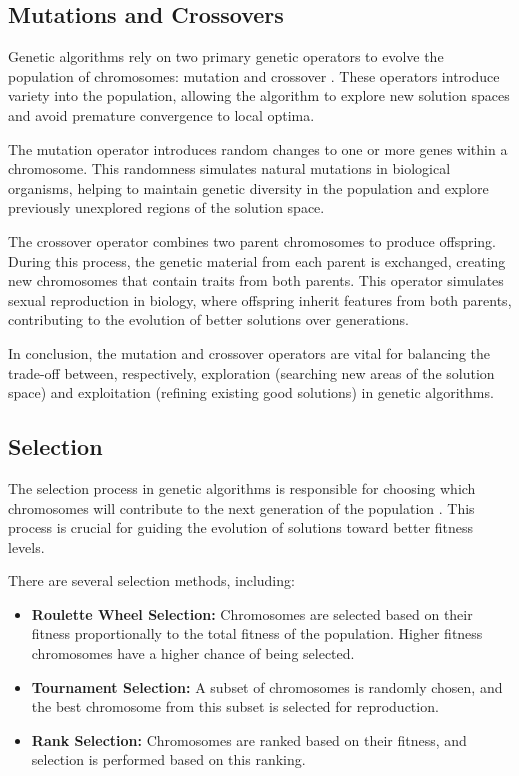     \subsection{Mutations and Crossovers}
    
        Genetic algorithms rely on two primary genetic operators to evolve the population of chromosomes: mutation and crossover \cite{holland1992adaptation}. These operators introduce variety into the population, allowing the algorithm to explore new solution spaces and avoid premature convergence to local optima.
        
        The mutation operator introduces random changes to one or more genes within a chromosome. This randomness simulates natural mutations in biological organisms, helping to maintain genetic diversity in the population and explore previously unexplored regions of the solution space.
        
        The crossover operator combines two parent chromosomes to produce offspring. During this process, the genetic material from each parent is exchanged, creating new chromosomes that contain traits from both parents. This operator simulates sexual reproduction in biology, where offspring inherit features from both parents, contributing to the evolution of better solutions over generations.

        In conclusion, the mutation and crossover operators are vital for balancing the trade-off between, respectively, exploration (searching new areas of the solution space) and exploitation (refining existing good solutions) in genetic algorithms.

    \subsection{Selection}
        The selection process in genetic algorithms is responsible for choosing which chromosomes will contribute to the next generation of the population \cite{holland1992adaptation}. This process is crucial for guiding the evolution of solutions toward better fitness levels.
        
        There are several selection methods, including:
        \begin{itemize}
            \item \textbf{Roulette Wheel Selection:} Chromosomes are selected based on their fitness proportionally to the total fitness of the population. Higher fitness chromosomes have a higher chance of being selected.
            \item \textbf{Tournament Selection:} A subset of chromosomes is randomly chosen, and the best chromosome from this subset is selected for reproduction.
            \item \textbf{Rank Selection:} Chromosomes are ranked based on their fitness, and selection is performed based on this ranking.
        \end{itemize}
        
